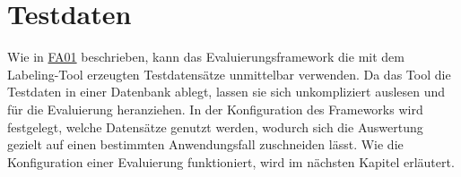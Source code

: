 \section{Testdaten}\label{sec:testdaten}

Wie in \hyperlink{FA01}{FA01} beschrieben, kann das Evaluierungsframework die mit dem Labeling-Tool erzeugten Testdatensätze unmittelbar verwenden. Da das Tool die Testdaten in einer Datenbank ablegt, lassen sie sich unkompliziert auslesen und für die Evaluierung heranziehen. In der Konfiguration des Frameworks wird festgelegt, welche Datensätze genutzt werden, wodurch sich die Auswertung gezielt auf einen bestimmten Anwendungsfall zuschneiden lässt. Wie die Konfiguration einer Evaluierung funktioniert, wird im nächsten Kapitel erläutert.